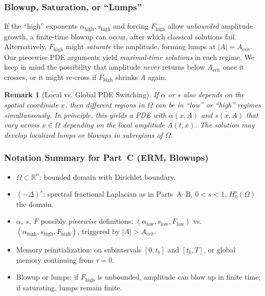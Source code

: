 \documentclass[12pt]{article}
\newtheorem{remark}[theorem]{Remark}
\begin{document}
\subsubsection{Blowup, Saturation, or “Lumps”}
\label{subsubsec:blowup_saturate}

If the “high” exponents $\alpha_{\mathrm{high}}, s_{\mathrm{high}}$ and forcing 
$F_{\mathrm{high}}$ allow \emph{unbounded} amplitude growth, a finite-time blowup can 
occur, after which classical solutions fail. Alternatively, $F_{\mathrm{high}}$ might 
\emph{saturate} the amplitude, forming lumps at $\lvert A\rvert = A_{\mathrm{crit}}$.  
Our piecewise PDE arguments yield \emph{maximal‐time solutions} in each regime.  
We keep in mind the possibility that amplitude \emph{never} returns below $A_{\mathrm{crit}}$ 
once it crosses, or it might re-cross if $F_{\mathrm{high}}$ shrinks $A$ again.

\begin{remark}[Local vs. Global PDE Switching]
If $\alpha$ or $s$ also depends on the spatial coordinate $x$, then different regions 
in $\Omega$ can be in “low” or “high” regimes simultaneously. In principle, this yields 
a PDE with \(\alpha(x,A)\) and $s(x,A)$ that vary across $x\in \Omega$ depending on 
the local amplitude $A(t,x)$. The solution may develop localized lumps or blowups in 
subregions of $\Omega$.
\end{remark}

\subsubsection{Notation Summary for Part~C (ERM, Blowups)}

\begin{itemize}
\item $\Omega\subset\mathbb{R}^n$: bounded domain with Dirichlet boundary. 
\item $(-\Delta)^s$: spectral fractional Laplacian as in Parts~A--B, 
      $0<s<1$, $H_0^s(\Omega)$ the domain. 
\item $\alpha,\ s,\ F$ possibly \emph{piecewise} definitions: 
      $(\alpha_{\mathrm{low}}, s_{\mathrm{low}}, F_{\mathrm{low}})$ vs.\ 
      $(\alpha_{\mathrm{high}}, s_{\mathrm{high}}, F_{\mathrm{high}})$, 
      triggered by $\lvert A\rvert>A_{\mathrm{crit}}$. 
\item Memory reinitialization: on subintervals $[0,t_b]$ and $[t_b,T]$, 
      or global memory continuing from $\tau=0$. 
\item Blowup or lumps: if $F_{\mathrm{high}}$ is unbounded, amplitude 
      can blow up in finite time; if saturating, lumps remain finite.
\end{itemize}
\end{document}

